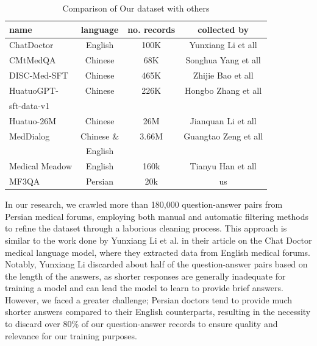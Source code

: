 \documentclass[conference]{IEEEtran}
\begin{document}
\begin{table}[ht]
	\centering
	\caption{Comparison of Our dataset with others}
	\begin{tabular}{|l|c|c|c|}  %
		\hline
   name            &language & no. records & collected by \\ \hline
   ChatDoctor 	   &English	 & 100K        & Yunxiang Li et all
   \cite{b10}
    \\ \hline
   CMtMedQA  	   &Chinese	 & 68K        &  Songhua Yang et all
   \cite{b10}
   \\ \hline
   DISC-Med-SFT	   &Chinese	 & 465K       & Zhijie Bao et all   
   \cite{b10}
   \\ \hline
   HuatuoGPT-	   &Chinese	 & 226K        & Hongbo Zhang et all   
   \cite{b10}
    \\ 
   sft-data-v1	   &	     &             & 	\\ \hline
   Huatuo-26M	   &Chinese	 & 26M         & Jianquan Li et all 
   \cite{b10}
   \\ \hline
   MedDialog       &Chinese \&&3.66M       & Guangtao Zeng et all  \\ 
                   &English  &             &   \\ \hline
   Medical Meadow  &English  & 160k        & Tianyu Han et all 
   \cite{b10}
   \\ \hline
   MF3QA           &Persian  & 20k            & us \\ \hline
	\end{tabular}
	\label{tab:model_results_on_mcqa}
\end{table}


In our research, we crawled more than 180,000 question-answer pairs from Persian medical forums, employing both manual and automatic filtering methods to refine the dataset through a laborious cleaning process. This approach is similar to the work done by Yunxiang Li et al. \cite{b6} in their article on the Chat Doctor medical language model, where they extracted data from English medical forums. Notably, Yunxiang Li discarded about half of the question-answer pairs based on the length of the answers, as shorter responses are generally inadequate for training a model and can lead the model to learn to provide brief answers. However, we faced a greater challenge; Persian doctors tend to provide much shorter answers compared to their English counterparts, resulting in the necessity to discard over 80\% of our question-answer records to ensure quality and relevance for our training purposes.
\end{document}
